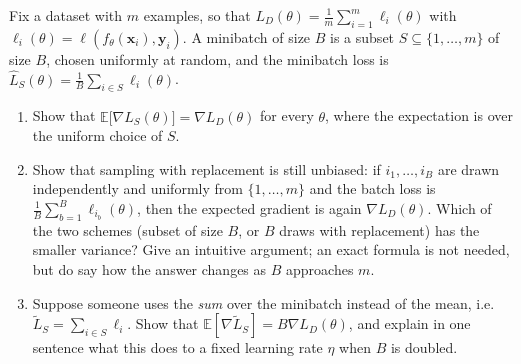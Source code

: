 \begin{exercise}\label{ex:ml-4}
Fix a dataset with $m$ examples, so that
$L_D(\theta)=\frac{1}{m}\sum_{i=1}^{m}\ell_i(\theta)$ with
$\ell_i(\theta)=\ell(f_\theta(\mathbf{x}_i),\mathbf{y}_i)$. A minibatch of size
$B$ is a subset $S\subseteq\{1,\ldots,m\}$ of size $B$, chosen uniformly at
random, and the minibatch loss is
$\hat L_S(\theta)=\frac{1}{B}\sum_{i\in S}\ell_i(\theta)$.
\begin{enumerate}[label=(\alph*)]
  \item Show that $\mathbb{E}\bigl[\nabla\hat L_S(\theta)\bigr]=\nabla L_D(\theta)$
    for every $\theta$, where the expectation is over the uniform choice of $S$.
  \item Show that sampling with replacement is still unbiased: if
    $i_1,\ldots,i_B$ are drawn independently and uniformly from
    $\{1,\ldots,m\}$ and the batch loss is
    $\frac{1}{B}\sum_{b=1}^{B}\ell_{i_b}(\theta)$, then the expected gradient
    is again $\nabla L_D(\theta)$. Which of the two schemes (subset of size
    $B$, or $B$ draws with replacement) has the smaller variance? Give an
    intuitive argument; an exact formula is not needed, but do say how the
    answer changes as $B$ approaches $m$.
  \item Suppose someone uses the \emph{sum} over the minibatch instead of the
    mean, i.e.\ $\tilde L_S=\sum_{i\in S}\ell_i$. Show that
    $\mathbb{E}[\nabla\tilde L_S]=B\nabla L_D(\theta)$, and explain in one
    sentence what this does to a fixed learning rate $\eta$ when $B$ is doubled.
\end{enumerate}
\end{exercise}

